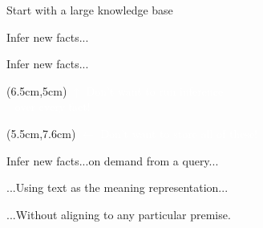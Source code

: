 \begin{frame}[noframenumbering]{Start with a large knowledge base}
\begin{center}
  \teaserManyPremises
\end{center}
\end{frame}

\begin{frame}[noframenumbering]{Infer new facts...}
\begin{center}
  \teaserBlindInferenceNaturalOrderBlind
\end{center}
\end{frame}

\begin{frame}[noframenumbering]{Infer new facts...}
\begin{center}
  \teaserBlindInferenceNaturalOrder
\end{center}
\pause
\begin{textblock*}{6.0cm}(6.5cm,5cm)
  \textcolor<1-1>{white}{$\uparrow$ Don't want to run inference \\ $~~$ over every fact!}
\end{textblock*}
\pause
\begin{textblock*}{6cm}(5.5cm,7.6cm)
  \textcolor<1-2>{white}{$\leftarrow$ Don't want to store all of these!}
\end{textblock*}
\end{frame}

\begin{frame}[noframenumbering]{Infer new facts...on demand from a query...}
\begin{center}
  \teaserBlindInference
\end{center}
\end{frame}

\begin{frame}[noframenumbering]{...Using text as the meaning representation...}
\begin{center}
  \teaserInference
\end{center}
\end{frame}

\begin{frame}[noframenumbering]{...Without aligning to any particular premise.}
\begin{center}
  \teaserFullDerivation
\end{center}
\end{frame}



